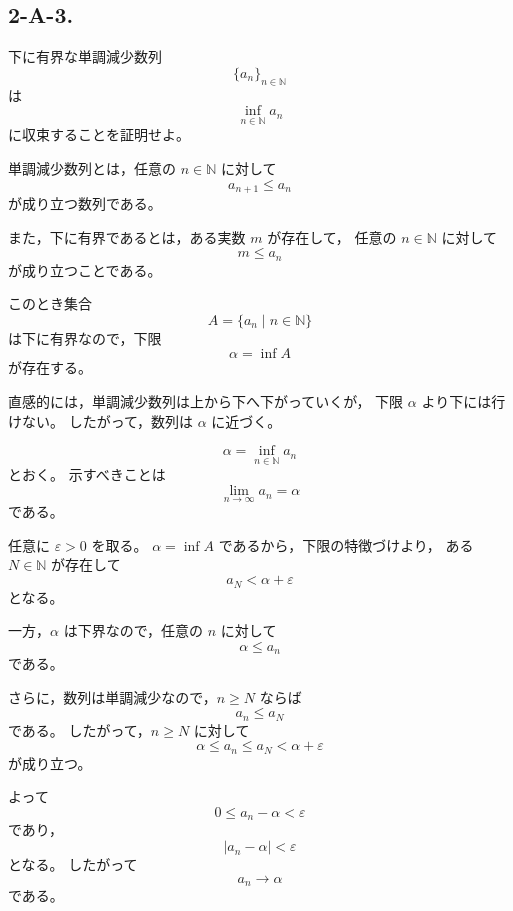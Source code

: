 \subsection{2-A-3.}
\begin{exercise}
	下に有界な単調減少数列
	\[
	\{a_n\}_{n\in\mathbb{N}}
	\]
	は
	\[
	\inf_{n\in\mathbb{N}} a_n
	\]
	に収束することを証明せよ。
\end{exercise}

\begin{background}
	単調減少数列とは，任意の \(n\in\mathbb{N}\) に対して
	\[
	a_{n+1}\leq a_n
	\]
	が成り立つ数列である。
	
	また，下に有界であるとは，ある実数 \(m\) が存在して，
	任意の \(n\in\mathbb{N}\) に対して
	\[
	m\leq a_n
	\]
	が成り立つことである。
	
	このとき集合
	\[
	A=\{a_n\mid n\in\mathbb{N}\}
	\]
	は下に有界なので，下限
	\[
	\alpha=\inf A
	\]
	が存在する。
	
	直感的には，単調減少数列は上から下へ下がっていくが，
	下限 \(\alpha\) より下には行けない。
	したがって，数列は \(\alpha\) に近づく。
\end{background}

\begin{strategy}
	\[
	\alpha=\inf_{n\in\mathbb{N}} a_n
	\]
	とおく。
	示すべきことは
	\[
	\lim_{n\to\infty}a_n=\alpha
	\]
	である。
	
	任意に \(\varepsilon>0\) を取る。
	\(\alpha=\inf A\) であるから，下限の特徴づけより，
	ある \(N\in\mathbb{N}\) が存在して
	\[
	a_N<\alpha+\varepsilon
	\]
	となる。
	
	一方，\(\alpha\) は下界なので，任意の \(n\) に対して
	\[
	\alpha\leq a_n
	\]
	である。
	
	さらに，数列は単調減少なので，\(n\geq N\) ならば
	\[
	a_n\leq a_N
	\]
	である。
	したがって，\(n\geq N\) に対して
	\[
	\alpha\leq a_n\leq a_N<\alpha+\varepsilon
	\]
	が成り立つ。
	
	よって
	\[
	0\leq a_n-\alpha<\varepsilon
	\]
	であり，
	\[
	|a_n-\alpha|<\varepsilon
	\]
	となる。
	したがって
	\[
	a_n\to\alpha
	\]
	である。
\end{strategy}
